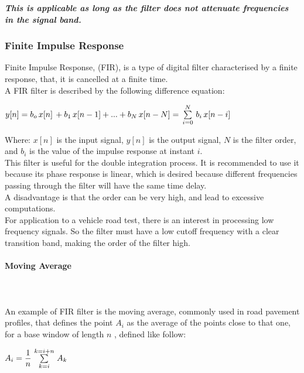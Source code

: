 \documentclass[tesi]{subfiles}
\begin{document}
\noindent \textit{\textbf{This is applicable as long as the filter does not attenuate frequencies in the signal band. }}

\subsubsection{Finite Impulse Response} \label{ssc:Finite Impulse Response}
Finite Impulse Response, (FIR), is a type of digital filter characterised by a finite response, that, it is cancelled at a finite time.\\
A FIR filter is described by the following difference equation:

\begin{center}
{\large $y[n] = b_{o} \thinspace x[n] \thinspace  + b_{1} \thinspace  x[n-1] + ... + b_{N} \thinspace  x[n - N] = \thinspace  \sum\limits_{i=0}^{N} \thinspace  b_{i} \thinspace  x[n-i]$}

\end{center}

\noindent Where: 
$x[n]$ is the input signal, $y[n]$ is the output signal, $N$ is the filter order, and $b_{i}$ is the value of the impulse response at instant $i$.\\
This filter is useful for the double integration process. It is recommended to use it because its phase response is linear, which is desired because different frequencies passing through the filter will have the same time delay.\\
A disadvantage is that the order can be very high, and lead to excessive computations.\\
For application to a vehicle road test, there is an interest in processing low frequency signals. So the filter must have a low cutoff frequency with a clear transition band, making the order of the filter high. \\

\clearpage
\paragraph{Moving Average} \leavevmode\\\\
An example of FIR filter is the moving average, commonly used in road pavement profiles, that defines the point $A_{i}$ as the average of the points close to that one, for a base window of length $n$ \cite{little_book}, defined like follow:
\begin{center}
{\large $ A_{i} = \dfrac{1}{n} \thinspace  \sum\limits_{k=i}^{k=i+n} \thinspace  A_{k}$}
\end{center}
\end{document}
